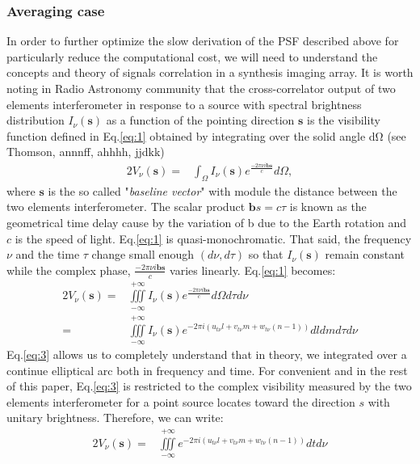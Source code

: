 \subsubsection{Averaging case}
In order to further optimize the slow derivation of the PSF described above for particularly reduce the computational
cost, we will need to understand the concepts and theory of signals correlation in a synthesis imaging array.
It is worth noting in Radio Astronomy community that the cross-correlator output of two elements interferometer
in response to a source with spectral brightness distribution $I_{\nu}(\mathbf{s})$ as a function of the pointing direction $\mathbf{s}$ 
is the visibility function defined in Eq.\ref{eq:1} obtained by integrating
over the solid angle dΩ (see Thomson, annnff, ahhhh, jjdkk)
\begin{alignat}{2}
V_{\nu}(\mathbf{s}) =& \int_{\Omega}I_{\nu}(\mathbf{s})e^{\frac{-2\pi\nu i \mathbf{b}\mathbf{s}}{c}}d\Omega, \label{eq:1}
\end{alignat}
where $\mathbf{s}$  is the so called "\textit{baseline vector}" with module the distance between the two elements
interferometer. The scalar product $\mathbf{b}{s}=c\tau$ is known as the geometrical time
delay cause by the variation of b due to the Earth rotation and $c$ is the speed of light. Eq.\ref{eq:1} is quasi-monochromatic.
That said, the frequency $\nu$ and the time $\tau$ change small  enough $(d\nu, d\tau)$ so that $I_{\nu}(\mathbf{s})$
remain constant while the complex phase, $\frac{-2\pi\nu i \mathbf{b}\mathbf{s}}{c}$ varies linearly.   Eq.\ref{eq:1} becomes:
\begin{alignat}{2}
V_{\nu}(\mathbf{s}) =& \iiint\limits_{-\infty}^{+\infty}I_{\nu}(\mathbf{s})e^{\frac{-2\pi\nu i \mathbf{b}\mathbf{s}}{c}}d\Omega d\tau d\nu \label{eq:2}\\	    
		    =& \iiint\limits_{-\infty}^{+\infty}I_{\nu}(\mathbf{s})e^{-2\pi i (u_{t\nu}l+v_{t\nu}m+w_{t\nu}(n-1))}dldm d\tau d\nu\label{eq:3}
\end{alignat}
Eq.\ref{eq:3} allows us to completely understand that in theory, we integrated over a continue elliptical arc both
in frequency and time. For convenient and in the rest of this paper, Eq.\ref{eq:3} is restricted to the complex visibility
measured by the two elements interferometer for a point source locates toward the direction $s$ with unitary brightness. 
Therefore, we can write:
\begin{alignat}{2}
V_{\nu}(\mathbf{s})  =& \iiint\limits_{-\infty}^{+\infty}e^{-2\pi i (u_{t\nu}l+v_{t\nu}m+w_{t\nu}(n-1))}dt d\nu\label{eq:4}
\end{alignat} %

